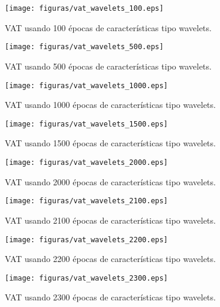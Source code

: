 \begin{figure}[H]
	\centering
	\texttt{[image: figuras/vat\_wavelets\_100.eps]}
	\caption{VAT usando 100 épocas de características tipo wavelets.}
	\label{vat: vat_wavelets_100}
\end{figure}
\begin{figure}[H]
	\centering
	\texttt{[image: figuras/vat\_wavelets\_500.eps]}
	\caption{VAT usando 500 épocas de características tipo wavelets.}
	\label{vat: vat_wavelets_500}
\end{figure}
\begin{figure}[H]
	\centering
	\texttt{[image: figuras/vat\_wavelets\_1000.eps]}
	\caption{VAT usando 1000 épocas de características tipo wavelets.}
	\label{vat: vat_wavelets_1000}
\end{figure}
\begin{figure}[H]
	\centering
	\texttt{[image: figuras/vat\_wavelets\_1500.eps]}
	\caption{VAT usando 1500 épocas de características tipo wavelets.}
	\label{vat: vat_wavelets_1500}
\end{figure}
\begin{figure}[H]
	\centering
	\texttt{[image: figuras/vat\_wavelets\_2000.eps]}
	\caption{VAT usando 2000 épocas de características tipo wavelets.}
	\label{vat: vat_wavelets_2000}
\end{figure}
\begin{figure}[H]
	\centering
	\texttt{[image: figuras/vat\_wavelets\_2100.eps]}
	\caption{VAT usando 2100 épocas de características tipo wavelets.}
	\label{vat: vat_wavelets_2100}
\end{figure}
\begin{figure}[H]
	\centering
	\texttt{[image: figuras/vat\_wavelets\_2200.eps]}
	\caption{VAT usando 2200 épocas de características tipo wavelets.}
	\label{vat: vat_wavelets_2200}
\end{figure}
\begin{figure}[H]
	\centering
	\texttt{[image: figuras/vat\_wavelets\_2300.eps]}
	\caption{VAT usando 2300 épocas de características tipo wavelets.}
	\label{vat: vat_wavelets_2300}
\end{figure}

